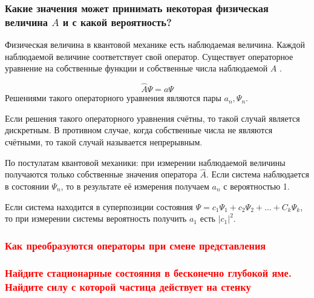 \subsubsection{Какие значения может принимать некоторая физическая величина $A$ и с какой вероятность?
}


Физическая величина в квантовой механике есть наблюдаемая величина. Каждой наблюдаемой величине соответствует свой оператор. Существует операторное уравнение на собственные функции и собственные числа наблюдаемой $A$ .

$$\hat{A}\Psi=a\Psi$$
Решениями такого операторного уравнения являются пары $a_n,\Psi_n$. 

Если решения такого операторного уравнения счётны, то такой случай является дискретным. В противном случае, когда собственные числа не являются счётными, то такой случай называется непрерывным.

По постулатам квантовой механики: при измерении наблюдаемой величины получаются только собственные значения оператора $\hat{A}$. Если система наблюдается в состоянии $\Psi_n$,  то в результате её измерения получаем $a_n$ с вероятностью 1.

Если система находится в суперпозиции состояния $\Psi=c_1\Psi_1+c_2\Psi_2+\dots+C_k\Psi_k$, то при измерении системы вероятность получить $a_1$ есть $|c_1|^2$.

\subsubsection{\textcolor{red} {Как преобразуются операторы при смене представления} }

\subsubsection{\textcolor{red} {Найдите стационарные состояния в бесконечно глубокой яме. Найдите силу с
которой частица действует на стенку} }